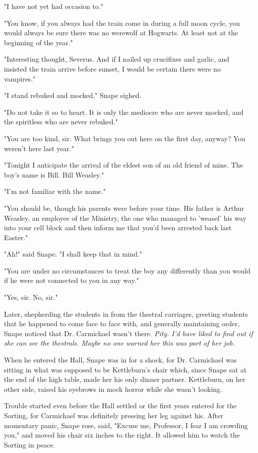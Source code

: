 \documentclass[a4paper,11pt]{article}
\begin{document}
"I have not yet had occasion to."

"You know, if you always had the train come in during a full moon cycle, you would always be sure there was no werewolf at Hogwarts. At least not at the beginning of the year."

"Interesting thought, Severus. And if I nailed up crucifixes and garlic, and insisted the train arrive before sunset, I would be certain there were no vampires."

"I stand rebuked and mocked," Snape sighed.

"Do not take it so to heart. It is only the mediocre who are never mocked, and the spiritless who are never rebuked."

"You are too kind, sir. What brings you out here on the first day, anyway? You weren't here last year."

"Tonight I anticipate the arrival of the eldest son of an old friend of mine. The boy's name is Bill. Bill Weasley."

"I'm not familiar with the name."

"You should be, though his parents were before your time. His father is Arthur Weasley, an employee of the Ministry, the one who managed to 'weasel' his way into your cell block and then inform me that you'd been arrested back last Easter."

"Ah!" said Snape. "I shall keep that in mind."

"You are under no circumstances to treat the boy any differently than you would if he were not connected to you in any way."

"Yes, sir. No, sir."

Later, shepherding the students in from the thestral carriages, greeting students that he happened to come face to face with, and generally maintaining order, Snape noticed that Dr. Carmichael wasn't there. \emph{Pity. I'd have liked to find out if she can see the thestrals. Maybe no one warned her this was part of her job.}

When he entered the Hall, Snape was in for a shock, for Dr. Carmichael was sitting in what was supposed to be Kettleburn's chair which, since Snape sat at the end of the high table, made her his only dinner partner. Kettleburn, on her other side, raised his eyebrows in mock horror while she wasn't looking.

Trouble started even before the Hall settled or the first years entered for the Sorting, for Carmichael was definitely pressing her leg against his. After momentary panic, Snape rose, said, "Excuse me, Professor, I fear I am crowding you," and moved his chair six inches to the right. It allowed him to watch the Sorting in peace.
\end{document}
